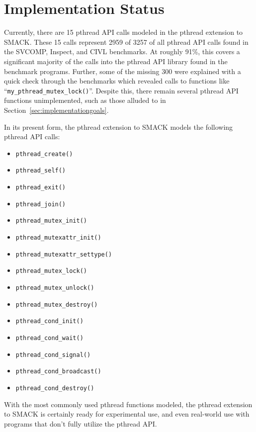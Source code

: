 \section{Implementation Status}
\label{sec:implementationstatus}
Currently, there are 15 pthread API calls modeled in the pthread
extension to SMACK.  These 15 calls represent 2959 of 3257 of all
pthread API calls found in the SVCOMP, Inspect, and CIVL
benchmarks. At roughly 91\%, this covers a significant majority of the
calls into the pthread API library found in the benchmark programs.
Further, some of the missing 300 were explained with a quick check
through the benchmarks which revealed calls to functions like
``\lstinline|my_pthread_mutex_lock()|''.  Despite this, there remain
several pthread API functions unimplemented, such as those alluded to
in Section~\ref{sec:implementationgoals}. 


In its present form, the pthread extension to SMACK models the
following pthread API calls:

\begin{multicols}{2}
\begin{itemize}
\item \lstinline|pthread_create()|
\item \lstinline|pthread_self()|
\item \lstinline|pthread_exit()|
\item \lstinline|pthread_join()|
\item \lstinline|pthread_mutex_init()|
\item \lstinline|pthread_mutexattr_init()|
\item \lstinline|pthread_mutexattr_settype()|
\item \lstinline|pthread_mutex_lock()|
\item \lstinline|pthread_mutex_unlock()|
\item \lstinline|pthread_mutex_destroy()|
\item \lstinline|pthread_cond_init()|
\item \lstinline|pthread_cond_wait()|
\item \lstinline|pthread_cond_signal()|
\item \lstinline|pthread_cond_broadcast()|
\item \lstinline|pthread_cond_destroy()|
\end{itemize}
\end{multicols}

With the most commonly used pthread functions modeled, the pthread
extension to SMACK is certainly ready for experimental use, and even
real-world use with programs that don't fully utilize the pthread
API. 

